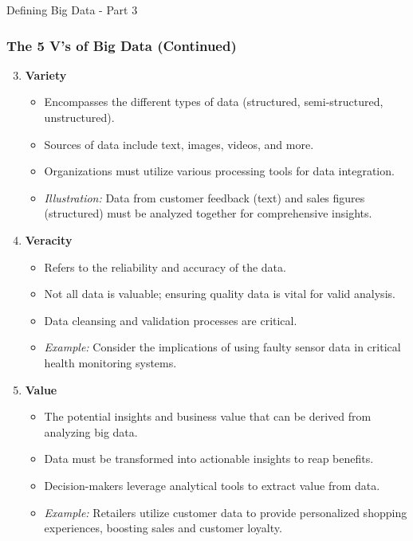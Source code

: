 \documentclass[aspectratio=169]{beamer}
\begin{document}
\begin{frame}[fragile]{Defining Big Data - Part 3}
    \frametitle{The 5 V's of Big Data (Continued)}

    \begin{enumerate}
        \setcounter{enumi}{2}
        \item \textbf{Variety}
            \begin{itemize}
                \item Encompasses the different types of data (structured, semi-structured, unstructured).
                \item Sources of data include text, images, videos, and more.
                \item Organizations must utilize various processing tools for data integration.
                \item \textit{Illustration:} Data from customer feedback (text) and sales figures (structured) must be analyzed together for comprehensive insights.
            \end{itemize}
            
        \item \textbf{Veracity}
            \begin{itemize}
                \item Refers to the reliability and accuracy of the data.
                \item Not all data is valuable; ensuring quality data is vital for valid analysis.
                \item Data cleansing and validation processes are critical.
                \item \textit{Example:} Consider the implications of using faulty sensor data in critical health monitoring systems.
            \end{itemize}
            
        \item \textbf{Value}
            \begin{itemize}
                \item The potential insights and business value that can be derived from analyzing big data.
                \item Data must be transformed into actionable insights to reap benefits.
                \item Decision-makers leverage analytical tools to extract value from data.
                \item \textit{Example:} Retailers utilize customer data to provide personalized shopping experiences, boosting sales and customer loyalty.
            \end{itemize}
    \end{enumerate}
\end{frame}
\end{document}
